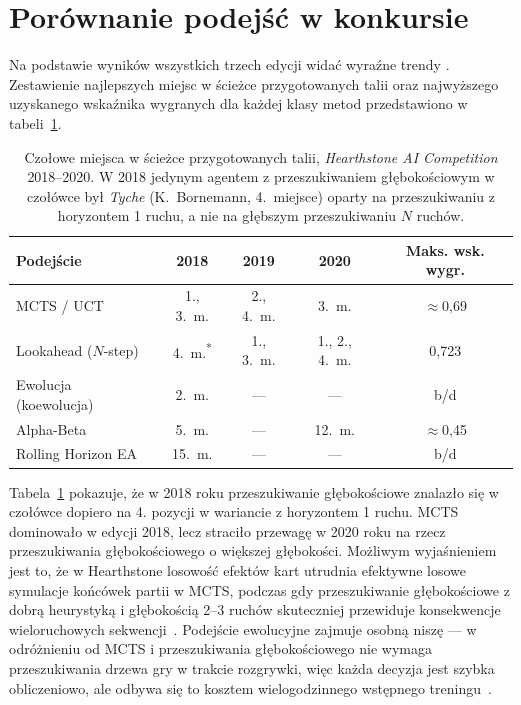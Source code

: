 \section{Porównanie podejść w konkursie}

Na podstawie wyników wszystkich trzech edycji widać wyraźne trendy \cite{hearthstone_competition, dockhorn2019}. Zestawienie najlepszych miejsc w ścieżce przygotowanych talii oraz najwyższego uzyskanego wskaźnika wygranych dla każdej klasy metod przedstawiono w tabeli~\ref{tab:competition_approaches}.

\begin{table}[h!]
\centering
\caption{Czołowe miejsca w ścieżce przygotowanych talii, \textit{Hearthstone AI Competition} 2018--2020. W 2018 jedynym agentem z przeszukiwaniem głębokościowym w czołówce był \textit{Tyche} (K.~Bornemann, 4.~miejsce) oparty na przeszukiwaniu z horyzontem 1 ruchu, a nie na głębszym przeszukiwaniu $N$ ruchów.}
\label{tab:competition_approaches}
\begin{tabular}{lcccc}
\toprule
\textbf{Podejście} & \textbf{2018} & \textbf{2019} & \textbf{2020} & \textbf{Maks. wsk. wygr.} \\
\midrule
MCTS / UCT            & 1., 3.~m. & 2., 4.~m. & 3.~m.         & $\approx$0{,}69 \\
Lookahead ($N$-step)  & 4.~m.\textsuperscript{*} & 1., 3.~m. & 1., 2., 4.~m. & 0{,}723         \\
Ewolucja (koewolucja) & 2.~m.     & ---        & ---           & b/d             \\
Alpha-Beta            & 5.~m.     & ---        & 12.~m.        & $\approx$0{,}45 \\
Rolling Horizon EA    & 15.~m.    & ---        & ---           & b/d             \\
\bottomrule
\end{tabular}
\end{table}

Tabela~\ref{tab:competition_approaches} pokazuje, że w 2018 roku przeszukiwanie głębokościowe znalazło się w czołówce dopiero na 4. pozycji w wariancie z horyzontem 1 ruchu. MCTS dominowało w edycji 2018, lecz straciło przewagę w 2020 roku na rzecz przeszukiwania głębokościowego o większej głębokości. Możliwym wyjaśnieniem jest to, że w Hearthstone losowość efektów kart utrudnia efektywne losowe symulacje końcówek partii w MCTS, podczas gdy przeszukiwanie głębokościowe z dobrą heurystyką i głębokością 2--3 ruchów skuteczniej przewiduje konsekwencje wieloruchowych sekwencji~\cite{dockhorn2019}. Podejście ewolucyjne zajmuje osobną niszę --- w odróżnieniu od MCTS i przeszukiwania głębokościowego nie wymaga przeszukiwania drzewa gry w trakcie rozgrywki, więc każda decyzja jest szybka obliczeniowo, ale odbywa się to kosztem wielogodzinnego wstępnego treningu~\cite{sanchez2020}.
